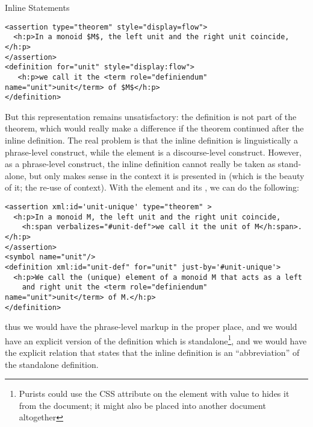 \begin{omgroup}[short=Mathematical Statements,id=statements]
\begin{omgroup}[id=inline-statements]{Inline Statements}
\begin{module}[id=inline-statements]
\begin{lstlisting}[mathescape,caption=A Simple-Minded Representation of {\presbf{Theorem 3.12}}]
<assertion type="theorem" style="display=flow">
  <h:p>In a monoid $M$, the left unit and the right unit coincide,</h:p>
</assertion>
<definition for="unit" style="display:flow">
   <h:p>we call it the <term role="definiendum" name="unit">unit</term> of $M$</h:p>
</definition>
\end{lstlisting}

But this representation remains unsatisfactory: the definition is not part of the theorem,
which would really make a difference if the theorem continued after the inline
definition. The real problem is that the inline definition is linguistically a
phrase-level construct, while the {} element is a discourse-level
construct. However, as a phrase-level construct, the inline definition cannot really be
taken as stand-alone, but only makes sense in the context it is presented in (which is the
beauty of it; the re-use of context). With the {} element and its
{}, we can do the following:

\begin{lstlisting}[mathescape,caption=An Inline Definition]
<assertion xml:id='unit-unique' type="theorem" >
  <h:p>In a monoid M, the left unit and the right unit coincide,
    <h:span verbalizes="#unit-def">we call it the unit of M</h:span>.</h:p>
</assertion>
<symbol name="unit"/>
<definition xml:id="unit-def" for="unit" just-by='#unit-unique'>
  <h:p>We call the (unique) element of a monoid M that acts as a left 
    and right unit the <term role="definiendum" name="unit">unit</term> of M.</h:p>
</definition>
\end{lstlisting}

thus we would have the phrase-level markup in the proper place, and we would have an
explicit version of the definition which is standalone\footnote{Purists could use the CSS
  attribute {} on the {} element with
  value {} to hides it from the document; it might also
  be placed into another document altogether}, and we would have the explicit relation
that states that the inline definition is an ``abbreviation'' of the standalone
definition.
\end{module}
\end{omgroup}


\end{omgroup}
